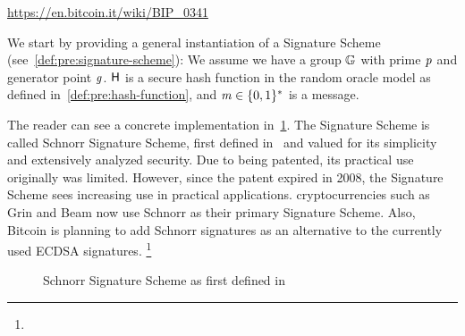 \urldef\urlbiptaproot\url{https://en.bitcoin.it/wiki/BIP_0341}

We start by providing a general instantiation of a Signature Scheme (see~\cref{def:pre:signature-scheme}):
We assume we have a group $\mathbb{G}$ with prime $\mathit{p}$ and generator point $\mathit{g}$.
$\mathsf{H}$ is a secure hash function in the random oracle model as defined in~\cref{def:pre:hash-function}, and $\mathit{m} \in \{0,1\}^{*}$ is a message.


The reader can see a concrete implementation in~\cref{fig:schnorr}.
The Signature Scheme is called Schnorr Signature Scheme, first defined in~\cite{schnorr1989efficient} and valued for its simplicity and extensively analyzed security.
Due to being patented, its practical use originally was limited.
However, since the patent expired in 2008, the Signature Scheme sees increasing use in practical applications.
cryptocurrencies such as Grin and Beam now use Schnorr as their primary Signature Scheme.
Also, Bitcoin is planning to add Schnorr signatures as an alternative to the currently used ECDSA signatures. \footnote{\urlbiptaproot}
\begin{figure}
    \begin{center}
        \fbox{
        \begin{varwidth}{\textwidth}
            \procedure[linenumbering]{$\procSetup{\varSecParam}$} {
            \varKey \sample \cnstIntegersPrimeWithoutZero{\varPrime} \\
            \pcreturn (\varSecKey \opAssign \varKey \opSeperate \varPubKey \opAssign \funGen{\varKey})
            }
            \procedure[linenumbering]{$\procSign{\varMsg}{\varSecKey}$}{
            \varNonce \sample \cnstIntegersPrimeWithoutZero{\varPrime} \\
            \varRand \opAssign \funGen{\varNonce} \\
            \varSchnorrChallenge \opAssign \funHash{\varMsg \opConc \varRand \opConc \varPubKey} \\
            \varS \opAssign \varNonce \opAddScalar \varSchnorrChallenge \opTimesScalar \varSecKey \\
            \pcreturn \varSignature \opAssign (\varS, \varRand)
            }
            \procedure[linenumbering]{$\procVerf{\varMsg}{\varSignature}{\varPubKey}$} {
            (\varS \opSeperate \varRand) \opFunResult \varSignature \\
            \varSchnorrChallenge \opAssign \funHash{\varMsg \opConc \varRand \opConc \varPubKey} \\
            \pcreturn \funGen{\varS} \opEqNoQ \varRand \opAddPoint \opPointScalar{\varPubKey}{\varSchnorrChallenge}
            }
        \end{varwidth}
        }
    \end{center}
    \caption{Schnorr Signature Scheme as first defined in~\cite{schnorr1989efficient}}
    \label{fig:schnorr}
\end{figure}


